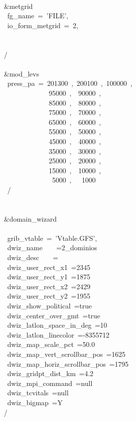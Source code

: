 \\
\&metgrid\\
~fg\_name~=~'FILE',\\
~io\_form\_metgrid~=~2,\\
\\
\\
/\\
\\
\&mod\_levs\\
~press\_pa~=~201300~,~200100~,~100000~,\\
~~~~~~~~~~~~~95000~,~~90000~,\\
~~~~~~~~~~~~~85000~,~~80000~,\\
~~~~~~~~~~~~~75000~,~~70000~,\\
~~~~~~~~~~~~~65000~,~~60000~,\\
~~~~~~~~~~~~~55000~,~~50000~,\\
~~~~~~~~~~~~~45000~,~~40000~,\\
~~~~~~~~~~~~~35000~,~~30000~,\\
~~~~~~~~~~~~~25000~,~~20000~,\\
~~~~~~~~~~~~~15000~,~~10000~,\\
~~~~~~~~~~~~~~5000~,~~~1000\\
~/\\
\\
\\
\&domain\_wizard\\
\\
~grib\_vtable~=~'Vtable.GFS',\\
~dwiz\_name~~~~=2\_dominios\\
~dwiz\_desc~~~~=\\
~dwiz\_user\_rect\_x1~=2345\\
~dwiz\_user\_rect\_y1~=1875\\
~dwiz\_user\_rect\_x2~=2429\\
~dwiz\_user\_rect\_y2~=1955\\
~dwiz\_show\_political~=true\\
~dwiz\_center\_over\_gmt~=true\\
~dwiz\_latlon\_space\_in\_deg~=10\\
~dwiz\_latlon\_linecolor~=-8355712\\
~dwiz\_map\_scale\_pct~=50.0\\
~dwiz\_map\_vert\_scrollbar\_pos~=1625\\
~dwiz\_map\_horiz\_scrollbar\_pos~=1795\\
~dwiz\_gridpt\_dist\_km~=4.2\\
~dwiz\_mpi\_command~=null\\
~dwiz\_tcvitals~=null\\
~dwiz\_bigmap~=Y\\
/\\


